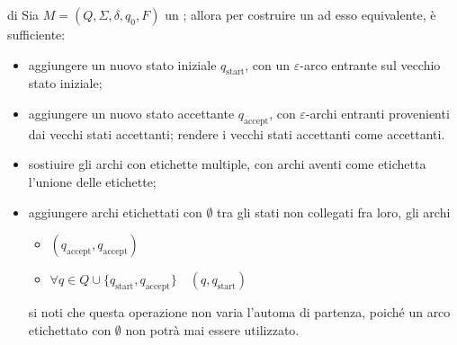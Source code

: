 \documentclass[a4paper, 12pt]{report}
\begin{document}
    \begin{framedmeth}[label={dfa into gnfa},breakable]{\GNFA di \DFA}
        Sia $M = (Q, \Sigma, \delta, q_0, F)$ un \DFA; allora per costruire un \GNFA ad esso equivalente, è sufficiente:

        \begin{itemize}
            \item aggiungere un nuovo stato iniziale $q_\mathrm{start}$, con un $\varepsilon$-arco entrante sul vecchio stato iniziale;
            \item aggiungere un nuovo stato accettante $q_\mathrm{accept}$, con $\varepsilon$-archi entranti provenienti dai vecchi stati accettanti; rendere i vecchi stati accettanti come  accettanti.
            \item sostiuire gli archi con etichette multiple, con archi aventi come etichetta l'unione delle etichette;
            \item aggiungere archi etichettati con $\emptyset$ tra gli stati non collegati fra loro,  gli archi

                \begin{itemize}
                    \item $(q_\mathrm{accept}, q_\mathrm{accept})$
                    \item $\forall q \in Q \cup \{q_\mathrm{start}, q_\mathrm{accept}\} \quad (q, q_\mathrm{start})$
                \end{itemize}

                si noti che questa operazione non varia l'automa di partenza, poiché un arco etichettato con $\emptyset$ non potrà mai essere utilizzato.
        \end{itemize}
    \end{framedmeth}
\end{document}
